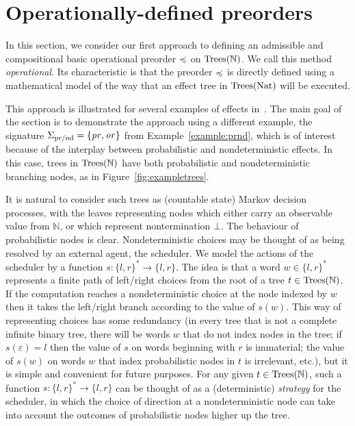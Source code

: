 \section{Operationally-defined preorders}
\label{section:operational}

In this section, we consider our first approach to defining an admissible and compositional basic operational
preorder $\preccurlyeq$ on $\textnormal{Trees}(\mathbb{N})$. We call this method \emph{operational}. Its characteristic is that the preorder
 $\preccurlyeq$ is directly defined using a mathematical model of the way that an effect tree in $\textnormal{Trees}(\mathbb{\textnormal{Nat}})$ will be executed.

This approach is illustrated for several examples of effects in~\cite{gom}. 
The main goal of the section is to demonstrate the approach using a different example, the signature
$\Sigma_{\text{pr/nd}} = \{\operatorname{\mathit{pr}},\operatorname{\mathit{or}}\}$ from Example~\ref{example:prnd}, which is of interest because of the 
interplay between probabilistic and nondeterministic effects. 
In this case, trees in $\textnormal{Trees}(\mathbb{N})$ have both probabilistic and nondeterministic branching nodes,
as in Figure~\ref{fig:exampletrees}.


It is natural to consider such trees as (countable state) Markov decision processes, with the leaves representing nodes which either carry an observable value from $\mathbb{N}$, or which represent nontermination $\bot$.
The behaviour of probabilistic nodes is clear. Nondeterministic choices may be thought of as being resolved by an external agent, the scheduler. We model the actions of the scheduler by a 
function $s: \{l,r\}^* \to \{l,r\}$. The idea is that a word $w \in \{l,r\}^*$ represents a finite path of left/right choices from the root of a 
tree $t \in \textnormal{Trees}(\mathbb{N})$. If the computation reaches a nondeterministic choice at the node indexed by 
$w$ then it takes the left/right branch according to the value of $s(w)$. This way of representing choices has some redundancy
(in every tree that is not a complete infinite binary tree, there will be words $w$ that do not index nodes in the tree; if $s(\varepsilon) = l$ then the value of $s$ on words beginning with $r$ is immaterial; the value of $s(w)$ on words $w$ that index 
probabilistic nodes in $t$ is irrelevant, etc.), but it is simple and convenient for future purposes. 
For any given $t \in \textnormal{Trees}(\mathbb{N})$, such a function
$s: \{l,r\}^* \to \{l,r\}$ can be thought of as a (deterministic) \emph{strategy} for the scheduler, in which the choice of direction at a nondeterministic node  
can take into account the outcomes of probabilistic nodes higher up the tree.

